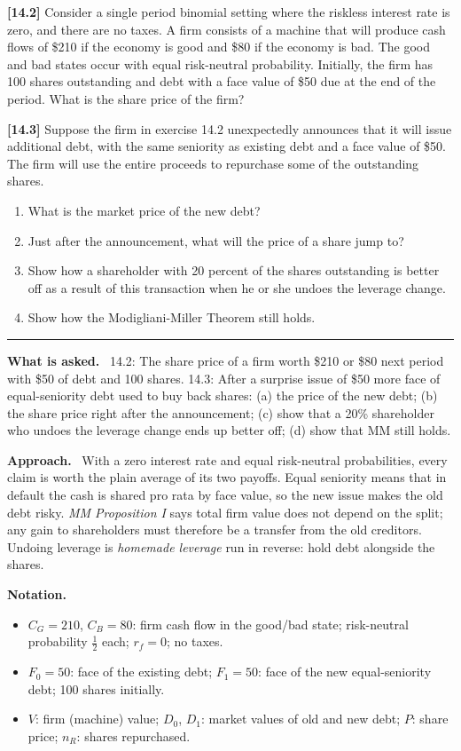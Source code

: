 \documentclass[11pt,a4paper]{article}
\numberwithin{equation}{section}
\newcommand{\notation}{\par\smallskip\noindent\textbf{Notation.}}
\newcommand{\asked}{\par\medskip\noindent\textbf{What is asked.}~}
\newcommand{\approach}{\par\smallskip\noindent\textbf{Approach.}~}
\newcommand{\stmtend}{\par\endgroup\nopagebreak\noindent\rule{\linewidth}{0.4pt}\par\medskip}
\begin{document}
\textbf{{[}14.2{]}} Consider a single period binomial setting where the riskless interest rate is
zero, and there are no taxes. A firm consists of a machine that will produce cash flows of \$210 if
the economy is good and \$80 if the economy is bad. The good and bad states occur with equal
risk-neutral probability. Initially, the firm has 100 shares outstanding and debt with a face value
of \$50 due at the end of the period. What is the share price of the firm?

\textbf{{[}14.3{]}} Suppose the firm in exercise 14.2 unexpectedly announces that it will issue
additional debt, with the same seniority as existing debt and a face value of \$50. The firm will
use the entire proceeds to repurchase some of the outstanding shares.

\begin{enumerate}
\def\labelenumi{\alph{enumi}.}
\item
  What is the market price of the new debt?
\item
  Just after the announcement, what will the price of a share jump to?
\item
  Show how a shareholder with 20 percent of the shares outstanding is better off as a result of this
  transaction when he or she undoes the leverage change.
\item
  Show how the Modigliani-Miller Theorem still holds.
\end{enumerate}
\stmtend

\asked
14.2: The share price of a firm worth \$210 or \$80 next period with \$50 of debt and 100 shares.
14.3: After a surprise issue of \$50 more face of equal-seniority debt used to buy back shares:
(a) the price of the new debt; (b) the share price right after the announcement; (c) show that a
20\% shareholder who undoes the leverage change ends up better off; (d) show that MM still holds.

\approach
With a zero interest rate and equal risk-neutral probabilities, every claim is worth the
plain average of its two payoffs. Equal seniority means that in default the cash is shared
pro rata by face value, so the new issue makes the old debt risky. \emph{MM Proposition I}
says total firm value does not depend on the split; any gain to shareholders must therefore be a
transfer from the old creditors. Undoing leverage is \emph{homemade leverage} run in reverse:
hold debt alongside the shares.

\notation
\begin{itemize}
  \item $C_G=210$, $C_B=80$: firm cash flow in the good/bad state; risk-neutral probability $\tfrac12$ each; $r_f=0$; no taxes.
  \item $F_0=50$: face of the existing debt; $F_1=50$: face of the new equal-seniority debt; 100 shares initially.
  \item $V$: firm (machine) value; $D_0$, $D_1$: market values of old and new debt; $P$: share price; $n_R$: shares repurchased.
\end{itemize}
\end{document}
